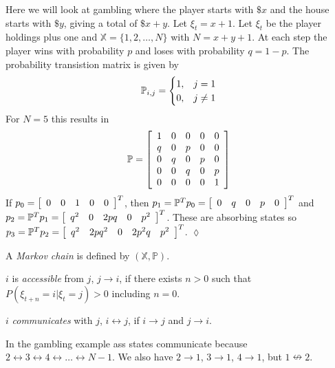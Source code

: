 \documentclass[lecture,12pt,]{pcms-l}
\begin{document}
\begin{example}
Here we will look at gambling where the player starts with $\$x$ and the house starts with $\$y$, giving a total of $\$x+y$. Let $\xi_t=x+1$. Let $\xi_t$ be the player holdings plus one and $\mathbb{X}=\{1,2,\ldots,N\}$ with $N=x+y+1$. At each step the player wins with probability $p$ and loses with probability $q=1-p$. The probability transistion matrix is given by
$$\mathbb{P}_{i,j} = \begin{cases} 1, & j=1 \\ 0, & j\neq1 \end{cases}$$
For $N=5$ this results in
\begin{align*}
\mathbb{P} = \left[\begin{array}{c c c c c}
1 & 0 & 0 & 0 & 0 \\
q & 0 & p & 0 & 0 \\
0 & q & 0 & p & 0 \\
0 & 0 & q & 0 & p \\
0 & 0 & 0 & 0 & 1
\end{array}\right]
\end{align*}
If $p_0 = \left[\begin{array}{c c c c c} 0 & 0 & 1 & 0 & 0 \end{array}\right]^T$, then $p_1=\mathbb{P}^Tp_0 = \left[\begin{array}{c c c c c} 0 & q & 0 & p & 0 \end{array}\right]^T$ and $p_2=\mathbb{P}^Tp_1=\left[\begin{array}{c c c c c} q^2 & 0 & 2pq & 0 & p^2 \end{array}\right]^T$. These are absorbing states so $p_3=\mathbb{P}^Tp_2=\left[\begin{array}{c c c c c} q^2 & 2pq^2 & 0 & 2p^2q & p^2 \end{array}\right]^T$.
$\lozenge$
\end{example}

\begin{definition}
A \textit{Markov chain} is defined by $(\mathbb{X},\mathbb{P})$.
\end{definition}

\begin{definition}
$i$ is \textit{accessible} from $j$, $j\rightarrow i$, if there exists $n>0$ such that $P(\xi_{t+n}=i|\xi_t=j)>0$ including $n=0$.
\end{definition}

\begin{definition}
$i$ \textit{communicates} with $j$, $i\leftrightarrow j$, if $i\rightarrow j$ and $j\rightarrow i$.
\end{definition}
In the gambling example ass states communicate because $2\leftrightarrow 3\leftrightarrow 4\leftrightarrow\ldots\leftrightarrow N-1$. We also have $2\rightarrow 1$, $3\rightarrow 1$, $4\rightarrow 1$, but $1\nleftrightarrow 2$.
\end{document}
